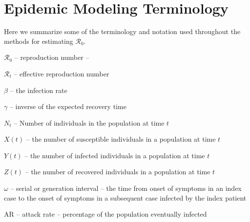 \documentclass[12pt]{article}
\newcommand{\rr}{\ensuremath{\mathcal{R}_0}}
\begin{document}
\section{Epidemic Modeling Terminology}
\label{sec:term}

Here we summarize some of the terminology and notation used throughout the methods for estimating \rr.

{$\rr$} -- reproduction number -- 

{$\mathcal{R}_t$} -- effective reproduction number

{$\beta$} -- the infection rate

{$\gamma$} -- inverse of the expected recovery time

{$N_t$} -- Number of individuals in the population at time $t$

{$X(t)$} -- the number of susceptible individuals in a population at time $t$

{$Y(t)$} -- the number of infected individuals in a population at time $t$

{$Z(t)$} -- the number of recovered individuals in a population at time $t$

{$\omega$} -- serial or generation interval -- the time from onset of symptoms in an index case to the onset of symptoms in a subsequent case infected by the index patient

AR -- attack rate -- percentage of the population eventually infected
\end{document}
